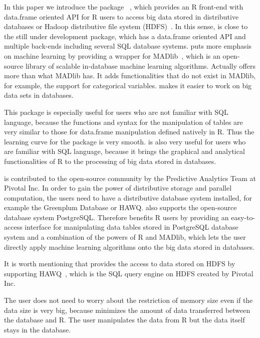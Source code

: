 In this paper we introduce the package
~\citep{pivotalr}, which provides an R front-end
with data.frame oriented API for R users to access big data stored in
distributive databases or Hadoop distributive file system
(HDFS)~\citep{hdfs}. In this sense,  is close to the
still under development  package, which has a data.frame
oriented API and multiple back-ends including several SQL database
systems.   puts more emphasis on machine learning by
providing a wrapper for MADlib~\citep{madlib}, which is an open-source
library of scalable in-database machine learning algorithms. Actually
 offers more than what MADlib has. It adds
functionalities that do not exist in MADlib, for example, the support
for categorical variables.  makes it easier to work on
big data sets in databases.

This package is especially useful for users who are not familiar with
SQL language, because the functions and syntax for the manipulation of
tables are very similar to those for data.frame manipulation defined
natively in R. Thus the learning curve for the package is very smooth.
 is also very useful for users who are familiar with SQL
language, because it brings the graphical and analytical
functionalities of R to the processing of big data stored in
databases.

 is contributed to the open-source community by the
Predictive Analytics Team at Pivotal Inc\@. In order to gain the power
of distributive storage and parallel computation, the users need to
have a distributive database system installed, for example the
Greenplum Database or HAWQ\@.  also supports the
open-source database system PostgreSQL\@. Therefore 
benefits R users by providing an easy-to-access interface for
manipulating data tables stored in PostgreSQL database system and a
combination of the powers of R and MADlib, which lets the user
directly apply machine learning algorithms onto the big data stored in
databases.

It is worth mentioning that  provides the access to data
stored on HDFS by supporting HAWQ~\citep{hawq}, which is the SQL query
engine on HDFS created by Pivotal Inc.

The user does not need to worry about the restriction of memory size
even if the data size is very big, because  minimizes
the amount of data transferred between the database and R. The user
manipulates the data from R but the data itself stays in the database.

